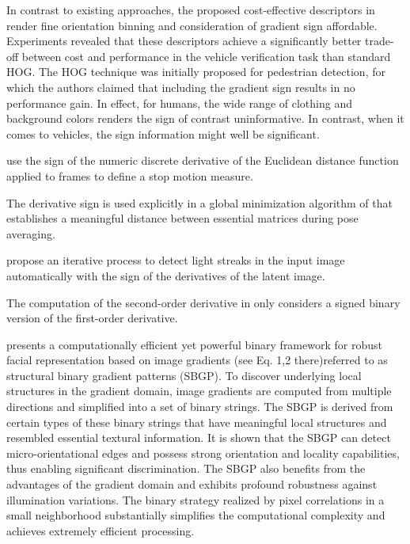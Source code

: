 \documentclass[11pt]{book}
\begin{document}
In contrast to existing approaches, the proposed cost-effective descriptors
in \cite{arrospide2013image} render fine orientation binning and
consideration of gradient sign affordable. Experiments revealed that
these descriptors achieve a significantly better trade-off between
cost and performance in the vehicle verification task than standard
HOG. The HOG technique was initially proposed for pedestrian detection,
for which the authors claimed that including the gradient sign results
in no performance gain. In effect, for humans, the wide range of clothing
and background colors renders the sign of contrast uninformative.
In contrast, when it comes to vehicles, the sign information might
well be significant.

\cite{redi20146} use the sign of the numeric discrete derivative
of the Euclidean distance function applied to frames to define a stop
motion measure.

The derivative sign is used explicitly in a global minimization algorithm
of \cite{tron2014quotient} that establishes a meaningful distance
between essential matrices during pose averaging.

\cite{hu2014deblurring} propose an iterative process to detect light
streaks in the input image automatically with the sign of the derivatives
of the latent image.

The computation of the second-order derivative in \cite{yang2016shape}
only considers a signed binary version of the first-order derivative.

\cite{huang2017robust} presents a computationally efficient yet powerful
binary framework for robust facial representation based on image gradients
(see Eq. 1,2 there)referred to as structural binary gradient patterns
(SBGP). To discover underlying local structures in the gradient domain,
image gradients are computed from multiple directions and simplified
into a set of binary strings. The SBGP is derived from certain types
of these binary strings that have meaningful local structures and
resembled essential textural information. It is shown that the SBGP
can detect micro-orientational edges and possess strong orientation
and locality capabilities, thus enabling significant discrimination.
The SBGP also benefits from the advantages of the gradient domain
and exhibits profound robustness against illumination variations.
The binary strategy realized by pixel correlations in a small neighborhood
substantially simplifies the computational complexity and achieves
extremely efficient processing.
\end{document}
